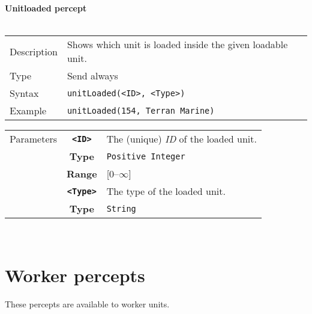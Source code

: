 \noindent
\textbf{Unitloaded percept}\\
\\
\begin{tabularx}{\textwidth}{lX}
 Description & Shows which unit is loaded inside the given loadable unit.\\
 Type & Send always \\
 Syntax & \verb|unitLoaded(<ID>, <Type>)| \\
 Example & \verb|unitLoaded(154, Terran Marine)| \\ 
 \end{tabularx}
 \begin{tabularx}{\textwidth}{l | c | p{8cm}|}
 \cline{2-3} 
 Parameters & \textbf{\verb|<ID>|} & The (unique) \textit{ID} of the loaded unit. \\
            & \textbf{Type} & \verb|Positive Integer| \\
            & \textbf{Range} & [0--$\infty$] \\
            \cline{2-3} 
            & \textbf{\verb|<Type>|} & The type of the loaded unit. \\
            & \textbf{Type} & \verb|String| \\
            \cline{2-3} 
\end{tabularx}\\

\section{Worker percepts}
These percepts are available to worker units.

